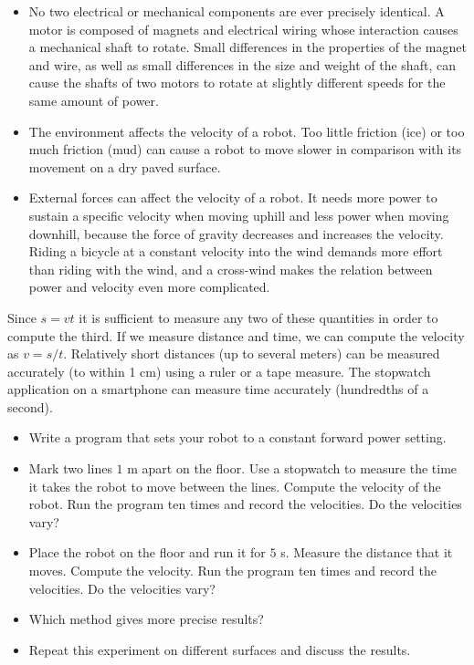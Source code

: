 \begin{itemize}
\item No two electrical or mechanical components are ever precisely identical. A motor is composed of magnets and electrical wiring whose interaction causes a mechanical shaft to rotate. Small differences in the properties of the magnet and wire, as well as small differences in the size and weight of the shaft, can cause the shafts of two motors to rotate at slightly different speeds for the same amount of power.

\item The environment affects the velocity of a robot. Too little friction (ice) or too much friction (mud) can cause a robot to move slower in comparison with its movement on a dry paved surface.

\item External forces can affect the velocity of a robot. It needs more power to sustain a specific velocity when moving uphill and less power when moving downhill, because the force of gravity decreases and increases the velocity. Riding a bicycle at a constant velocity into the wind demands more effort than riding with the wind, and a cross-wind makes the relation between power and velocity even more complicated.
\end{itemize}

Since $s=vt$ it is sufficient to measure any two of these quantities in order to compute the third. If we measure distance and time, we can compute the velocity as $v=s/t$. Relatively short distances (up to several meters) can be measured accurately (to within 1 cm) using a ruler or a tape measure. The stopwatch application on a smartphone can measure time accurately (hundredths of a second).

\begin{framed}
\begin{itemize}
\item Write a program that sets your robot to a constant forward power setting.
\item Mark two lines $1$ m apart on the floor. Use a stopwatch to measure the time it takes the robot to move between the lines. Compute the velocity of the robot. Run the program ten times and record the velocities. Do the velocities vary?
\item Place the robot on the floor and run it for $5$ s. Measure the distance that it moves. Compute the velocity. Run the program ten times and record the velocities. Do the velocities vary?
\item Which method gives more precise results?
\item Repeat this experiment on different surfaces and discuss the results.
\end{itemize}
\end{framed}

